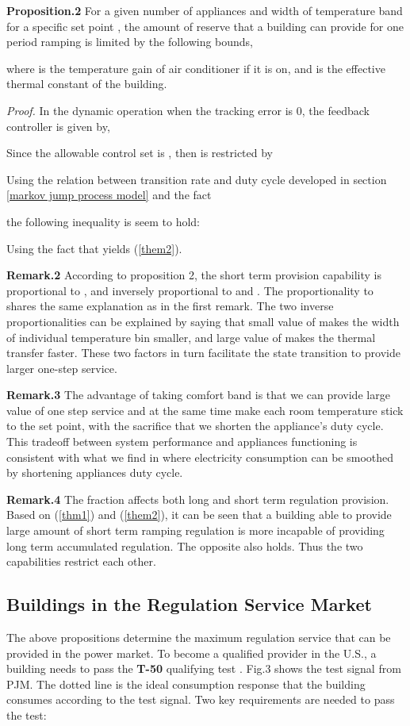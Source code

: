 \documentclass[journal]{IEEEtran}
\begin{document}
\textbf{Proposition.2} For a given number of appliances  and width of temperature band for a specific set point , the amount of reserve that a building can provide for one period ramping is limited by the following bounds,

where  is the temperature gain of air conditioner if it is on, and  is the effective thermal constant of the building.

\textit{Proof.} In the dynamic operation when the tracking error is 0, the feedback controller is given by,

Since the allowable control set is , then  is restricted by

Using the relation between transition rate and duty cycle developed in section \ref{markov jump process model} and the fact

the following inequality is seem to hold:

Using the fact that  yields (\ref{them2}). 

\textbf{Remark.2} According to proposition 2, the short term provision capability is proportional to , and inversely proportional to  and  . The proportionality to  shares the same explanation as in the first remark. The two inverse proportionalities can be explained by saying that small value of  makes the width of individual temperature bin smaller, and large value of  makes the thermal transfer faster. These two factors in turn facilitate the state transition to provide larger one-step service. 

\textbf{Remark.3} The advantage of taking comfort band  is that we can provide large value of one step service and at the same time make each room temperature stick to the set point, with the sacrifice that we shorten the appliance's duty cycle. This tradeoff between system performance and appliances functioning is consistent with what we find in \cite{bowen} where electricity consumption can be smoothed by shortening appliances duty cycle.

\textbf{Remark.4} The fraction  affects both long and short term regulation provision. Based on (\ref{thm1}) and (\ref{them2}), it can be seen that a building able to provide large amount of short term ramping regulation is more incapable of providing long term accumulated regulation. The opposite also holds. Thus the two capabilities restrict each other.

\subsection{Buildings in the Regulation Service Market}
The above propositions determine the maximum regulation service that can be provided in the power market. To become a qualified provider in the U.S., a building needs to pass the \textbf{T-50} qualifying test \cite{PJM}. Fig.3 shows the test signal from PJM. The dotted line is the ideal consumption response that the building consumes according to the test signal. Two key requirements are needed to pass the test:
\end{document}
